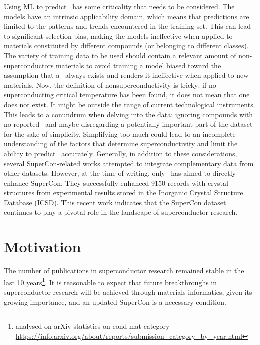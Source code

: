 Using ML to predict \tc~has some criticality that needs to be considered. 
The models have an intrinsic applicability domain, which means that predictions are limited to the patterns and trends encountered in the training set. 
This can lead to significant selection bias, making the models ineffective when applied to materials constituted by different compounds (or belonging to different classes). 
The variety of training data to be used should contain a relevant amount of non-superconductors materials to avoid training a model biased toward the assumption that a \tc~always exists and renders it ineffective when applied to new materials.
Now, the definition of nonsuperconductivity is tricky: if no superconducting critical temperature has been found, it does not mean that one does not exist. It might be outside the range of current technological instruments. 
This leads to a conundrum when delving into the data: ignoring compounds with no reported \tc~and maybe disregarding a potentially important part of the dataset for the sake of simplicity.
Simplifying too much could lead to an incomplete understanding of the factors that determine superconductivity and limit the ability to predict \tc~accurately. 
Generally, in addition to these considerations, several SuperCon-related works attempted to integrate complementary data from other datasets. 
However, at the time of writing, only~\cite{sommer20223dsc} has aimed to directly enhance SuperCon.  
They successfully enhanced 9150 records with crystal structures from experimental results stored in the Inorganic Crystal Structure Database (ICSD). 
This recent work indicates that the SuperCon dataset continues to play a pivotal role in the landscape of superconductor research.

\section{Motivation}

The number of publications in superconductor research remained stable in the last 10 years\footnote{analysed on arXiv statistics on cond-mat category \url{https://info.arxiv.org/about/reports/submission_category_by_year.html}}.
It is reasonable to expect that future breakthroughs in superconductor research will be achieved through materials informatics, given its growing importance, and an updated SuperCon is a necessary condition. 

